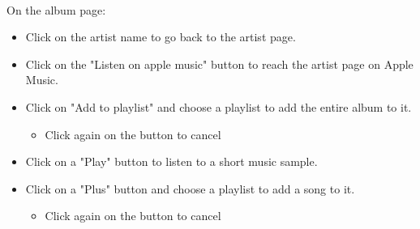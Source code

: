 \documentclass[11pt]{article}
\begin{document}
        \noindent \\
        On the album page:
        \begin{itemize}
        \item Click on the artist name to go back to the artist page.
        \item Click on the "Listen on apple music" button to reach the artist page on Apple Music.
        \item Click on "Add to playlist" and choose a playlist to add the entire album to it.
            \begin{itemize}
            \item Click again on the button to cancel
            \end{itemize}
        \item Click on a "Play" button to listen to a short music sample.
        \item Click on a "Plus" button and choose a playlist to add a song to it.
            \begin{itemize}
            \item Click again on the button to cancel
            \end{itemize}
        \end{itemize}
\end{document}
